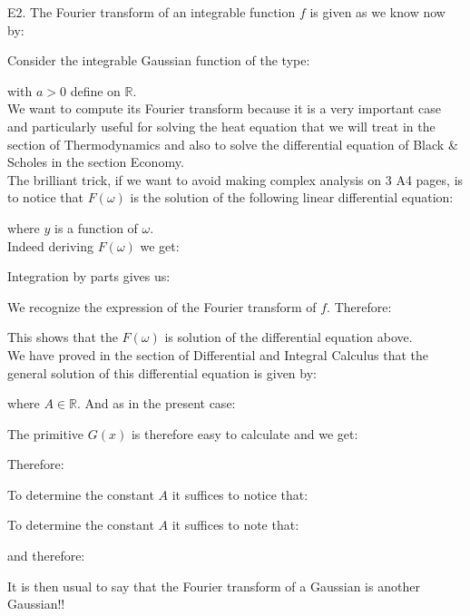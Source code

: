 	\pagebreak
	\begin{tcolorbox}[colframe=black,colback=white,sharp corners]
	E2. The Fourier transform of an integrable function $f$ is given as we know now by:
	
	Consider the integrable Gaussian function of the type:
	
	with $a>0$ define on $\mathbb{R}$.\\
	
	We want to compute its Fourier transform because it is a very important case and particularly useful for solving the heat equation that we will treat in the section of Thermodynamics and also to solve the differential equation of Black \& Scholes in the section Economy.\\
	
	The brilliant trick, if we want to avoid making complex analysis on $3$ A4 pages, is to notice that $F(\omega)$ is the solution of the following linear differential equation:
	
	where $y$ is a function of $\omega$.\\
	
	Indeed deriving  $F(\omega)$  we get:
	
	Integration by parts gives us:
	
	\end{tcolorbox}
	
	\pagebreak
	\begin{tcolorbox}[colframe=black,colback=white,sharp corners]
	We recognize the expression of the Fourier transform of $f$. Therefore:
	
	This shows that the $F(\omega)$ is solution of the differential equation above.\\
	
	We have proved in the section of Differential and Integral Calculus  that the general solution of this differential equation is given by:
	
	where $A \in \mathbb{R}$. And as in the present case:
	
	The primitive $G (x)$ is therefore easy to calculate and we get:
	
	Therefore:
	
	To determine the constant $A$ it suffices to notice that:
	
	To determine the constant $A$ it suffices to note that:
	
	and therefore:
	
	It is then usual to say that the Fourier transform of a Gaussian is another Gaussian!!
	\end{tcolorbox}
	
